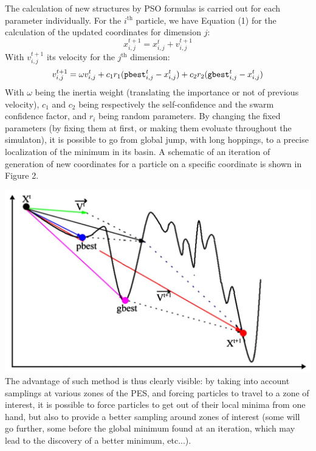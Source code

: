 \documentclass[11pt]{article}
\begin{document}
\begin{multicols}{2}
The calculation of new structures by PSO formulas is carried out for each parameter individually.
For the $i^\text{th}$ particle, we have Equation (1) for the calculation of the updated coordinates for dimension $j$:
\begin{equation}
    x_{i,j}^{t+1}=x_{i,j}^{t}+v_{i,j}^{t+1}
\end{equation}
With $v_{i,j}^{t+1}$ its velocity for the $j^\text{th}$ dimension:
\begin{equation}
    v_{i,j}^{t+1}=\omega v_{i,j}^t+c_1r_1(\verb+pbest+_{i,j}^t-x_{i,j}^t)+c_2r_2(\verb+gbest+_{i,j}^t-x_{i,j}^t)
\end{equation}
With $\omega$ being the inertia weight (translating the importance or not of previous velocity), $c_1$ and $c_2$ being respectively the self-confidence and the swarm confidence factor, and $r_i$ being random parameters. By changing the fixed parameters (by fixing them at first, or making them evoluate throughout the simulaton), it is possible to go from global jump, with long hoppings, to a precise localization of the minimum in its basin.
A schematic of an iteration of generation of new coordinates for a particle on a specific coordinate is shown in Figure 2. 
\bigskip

              \noindent \includegraphics[width=\columnwidth]{figures/PSO.png}
                \medskip
The advantage of such method is thus clearly visible: by taking into account samplings at various zones of the PES, and forcing particles to travel to a zone of interest, it is possible to force particles to get out of their local minima from one hand, but also to provide a better sampling around zones of interest (some will go further, some before the global minimum found at an iteration, which may lead to the discovery of a better minimum, etc...).\vspace{1em}


\end{multicols}
\end{document}

